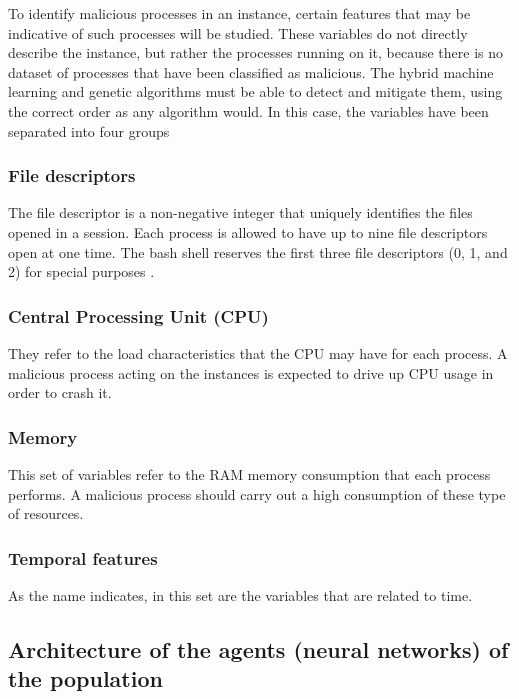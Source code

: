 \documentclass{iosart2c}
\begin{document}
To identify malicious processes in an instance, certain features that may be indicative of such processes will be studied. These variables do not directly describe the instance, but rather the processes running on it, because there is no dataset of processes that have been classified as malicious. The hybrid machine learning and genetic algorithms must be able to detect and mitigate them, using the correct order as any algorithm would. In this case, the variables have been separated into four groups


\subsubsection{File descriptors}

The file descriptor is a non-negative integer that uniquely identifies the files opened in a session. Each process is allowed to have up to nine file descriptors open at one time. The bash shell reserves the first three file descriptors (0, 1, and 2) for special purposes \cite{shell_scripting2}. 

\subsubsection{Central Processing Unit (CPU)}

They refer to the load characteristics that the CPU may have for each process. A malicious process acting on the instances is expected to drive up CPU usage in order to crash it.\\

\subsubsection{Memory}

This set of variables refer to the RAM memory consumption that each process performs. A malicious process should carry out a high consumption of these type of resources. 


\subsubsection{Temporal features}

As the name indicates, in this set are the variables that are related to time.\\

\subsection{Architecture of the agents (neural networks) of the population} \label{arquitectura_agents}
\end{document}
